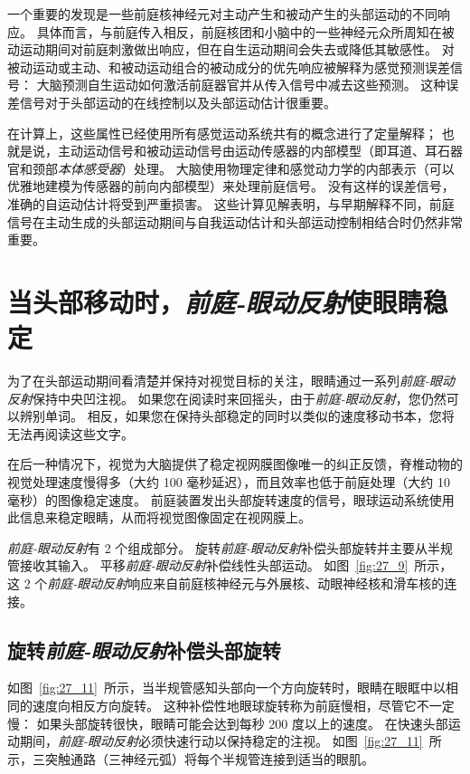 一个重要的发现是一些前庭核神经元对主动产生和被动产生的头部运动的不同响应。
具体而言，与前庭传入相反，前庭核团和小脑中的一些神经元众所周知在被动运动期间对前庭刺激做出响应，但在自生运动期间会失去或降低其敏感性。
对被动运动或主动、和被动运动组合的被动成分的优先响应被解释为感觉预测误差信号：
大脑预测自生运动如何激活前庭器官并从传入信号中减去这些预测。
这种误差信号对于头部运动的在线控制以及头部运动估计很重要。


在计算上，这些属性已经使用所有感觉运动系统共有的概念进行了定量解释；
也就是说，主动运动信号和被动运动信号由运动传感器的内部模型（即耳道、耳石器官和颈部\textit{本体感受器}）处理。
大脑使用物理定律和感觉动力学的内部表示（可以优雅地建模为传感器的前向内部模型）来处理前庭信号。
没有这样的误差信号，准确的自运动估计将受到严重损害。
这些计算见解表明，与早期解释不同，前庭信号在主动生成的头部运动期间与自我运动估计和头部运动控制相结合时仍然非常重要。



\section{当头部移动时，\textit{前庭-眼动反射}使眼睛稳定}

为了在头部运动期间看清楚并保持对视觉目标的关注，眼睛通过一系列\textit{前庭-眼动反射}保持中央凹注视。
如果您在阅读时来回摇头，由于\textit{前庭-眼动反射}，您仍然可以辨别单词。
相反，如果您在保持头部稳定的同时以类似的速度移动书本，您将无法再阅读这些文字。


在后一种情况下，视觉为大脑提供了稳定视网膜图像唯一的纠正反馈，脊椎动物的视觉处理速度慢得多（大约 100 毫秒延迟），而且效率也低于前庭处理（大约 10 毫秒）的图像稳定速度。
前庭装置发出头部旋转速度的信号，眼球运动系统使用此信息来稳定眼睛，从而将视觉图像固定在视网膜上。


\textit{前庭-眼动反射}有 2 个组成部分。
旋转\textit{前庭-眼动反射}补偿头部旋转并主要从半规管接收其输入。
平移\textit{前庭-眼动反射}补偿线性头部运动。
如图~\ref{fig:27_9}~所示，这 2 个\textit{前庭-眼动反射}响应来自前庭核神经元与外展核、动眼神经核和滑车核的连接。



\subsection{旋转\textit{前庭-眼动反射}补偿头部旋转}

如图~\ref{fig:27_11}~所示，当半规管感知头部向一个方向旋转时，眼睛在眼眶中以相同的速度向相反方向旋转。
这种补偿性地眼球旋转称为前庭慢相，尽管它不一定慢：
如果头部旋转很快，眼睛可能会达到每秒 200 度以上的速度。
在快速头部运动期间，\textit{前庭-眼动反射}必须快速行动以保持稳定的注视。
如图~\ref{fig:27_11}~所示，三突触通路（三神经元弧）将每个半规管连接到适当的眼肌。


